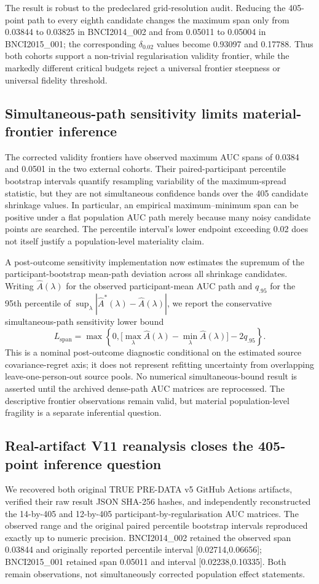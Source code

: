 The result is robust to the predeclared grid-resolution audit. Reducing the
405-point path to every eighth candidate changes the maximum span only from
0.03844 to 0.03825 in BNCI2014\_002 and from 0.05011 to 0.05004 in
BNCI2015\_001; the corresponding \(\delta_{0.02}\) values become 0.93097
and 0.17788. Thus both cohorts support a non-trivial regularisation validity
frontier, while the markedly different critical budgets reject a universal
frontier steepness or universal fidelity threshold.

\subsection{Simultaneous-path sensitivity limits material-frontier inference}
The corrected validity frontiers have observed maximum AUC spans of 0.0384
and 0.0501 in the two external cohorts. Their paired-participant percentile
bootstrap intervals quantify resampling variability of the maximum-spread
statistic, but they are not simultaneous confidence bands over the 405
candidate shrinkage values. In particular, an empirical maximum--minimum
span can be positive under a flat population AUC path merely because many
noisy candidate points are searched. The percentile interval's lower
endpoint exceeding 0.02 does not itself justify a population-level
materiality claim.

A post-outcome sensitivity implementation now estimates the supremum of the
participant-bootstrap mean-path deviation across all shrinkage candidates.
Writing \(\widehat A(\lambda)\) for the observed participant-mean AUC path
and \(q_{.95}\) for the 95th percentile of
\(\sup_\lambda|\widehat A^*(\lambda)-\widehat A(\lambda)|\), we report the
conservative simultaneous-path sensitivity lower bound
\[
  L_{\mathrm{span}}=
  \max\left\{0,
    \big[\max_\lambda\widehat A(\lambda)-
         \min_\lambda\widehat A(\lambda)\big]-2q_{.95}
  \right\}.
\]
This is a nominal post-outcome diagnostic conditional on the estimated
source covariance-regret axis; it does not represent refitting uncertainty
from overlapping leave-one-person-out source pools. No numerical
simultaneous-bound result is asserted until the archived dense-path AUC
matrices are reprocessed. The descriptive frontier observations remain
valid, but material population-level fragility is a separate inferential
question.

\subsection{Real-artifact V11 reanalysis closes the 405-point inference question}
We recovered both original TRUE PRE-DATA v5 GitHub Actions artifacts,
verified their raw result JSON SHA-256 hashes, and independently reconstructed
the 14-by-405 and 12-by-405 participant-by-regularisation AUC matrices.
The observed range and the original paired percentile bootstrap intervals
reproduced exactly up to numeric precision. BNCI2014\_002 retained the
observed span 0.03844 and originally reported percentile interval
[0.02714,0.06656]; BNCI2015\_001 retained span 0.05011 and interval
[0.02238,0.10335]. Both remain observations, not simultaneously
corrected population effect statements.

